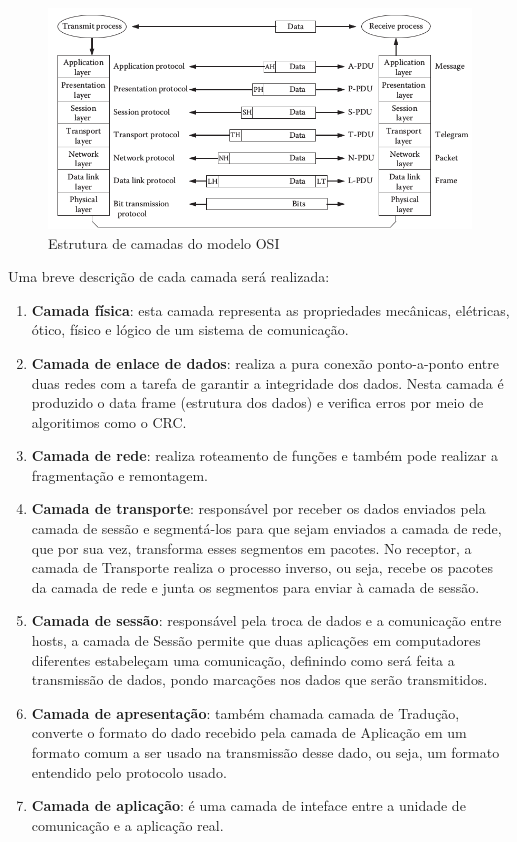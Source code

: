 \begin{figure}[H]
\centering
\includegraphics[width=\textwidth]{imagens/camadasosi}
\caption{Estrutura de camadas do modelo OSI}
\label{im::camadasosi}
\end{figure}

Uma breve descrição de cada camada será realizada:

\begin{enumerate}
\item {\bf Camada física}: esta camada representa as propriedades mecânicas, elétricas, ótico, físico e lógico de um sistema de comunicação. 
\item {\bf Camada de enlace de dados}: realiza a pura conexão ponto-a-ponto entre duas redes com a tarefa de garantir a integridade dos dados. Nesta camada é produzido o data frame (estrutura dos dados) e verifica erros por meio de algoritimos como o CRC.
\item {\bf Camada de rede}: realiza roteamento de funções e também pode realizar a fragmentação e remontagem.
\item {\bf Camada de transporte}: responsável por receber os dados enviados pela camada de sessão e segmentá-los para que sejam enviados a camada de rede, que por sua vez, transforma esses segmentos em pacotes. No receptor, a camada de Transporte realiza o processo inverso, ou seja, recebe os pacotes da camada de rede e junta os segmentos para enviar à camada de sessão.
\item {\bf Camada de sessão}: responsável pela troca de dados e a comunicação entre hosts, a camada de Sessão permite que duas aplicações em computadores diferentes estabeleçam uma comunicação, definindo como será feita a transmissão de dados, pondo marcações nos dados que serão transmitidos.
\item {\bf Camada de apresentação}:  também chamada camada de Tradução, converte o formato do dado recebido pela camada de Aplicação em um formato comum a ser usado na transmissão desse dado, ou seja, um formato entendido pelo protocolo usado. 
\item {\bf Camada de aplicação}: é uma camada de inteface entre a unidade de comunicação e a aplicação real.
\end{enumerate}

